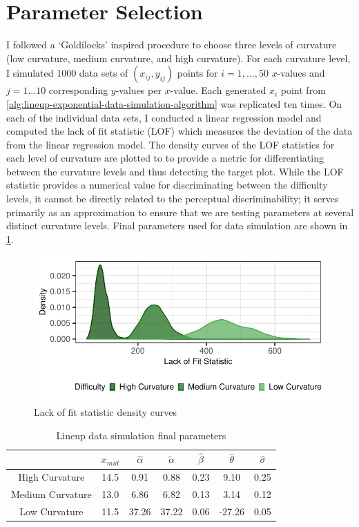 \documentclass[print]{nuthesis}
\begin{document}
\hypertarget{lineups-parameter-selection}{%
\section{Parameter Selection}\label{lineups-parameter-selection}}

I followed a `Goldilocks' inspired procedure to choose three levels of curvature (low curvature, medium curvature, and high curvature). For each curvature level, I simulated 1000 data sets of \((x_{ij}, y_{ij})\) points for \(i = 1,...,50\) \(x\)-values and \(j = 1...10\) corresponding \(y\)-values per \(x\)-value.
Each generated \(x_i\) point from \cref{alg:lineup-exponential-data-simulation-algorithm} was replicated ten times.
On each of the individual data sets, I conducted a linear regression model and computed the lack of fit statistic (LOF) which measures the deviation of the data from the linear regression model.
The density curves of the LOF statistics for each level of curvature are plotted  to to provide a metric for differentiating between the curvature levels and thus detecting the target plot.
While the LOF statistic provides a numerical value for discriminating between the difficulty levels, it cannot be directly related to the perceptual discriminability; it serves primarily as an approximation to ensure that we are testing parameters at several distinct curvature levels.
Final parameters used for data simulation are shown in \cref{tab:parameter-data}.

\begin{figure}[tbp]

{\centering \includegraphics[width=0.75\linewidth,]{thesis_files/figure-latex/lof-density-curves-1} 

}

\caption{Lack of fit statistic density curves}\label{fig:lof-density-curves}
\end{figure}

\begin{table}

\caption{\label{tab:parameter-data}Lineup data simulation final parameters}
\centering
\begin{tabular}[t]{ccccccc}
\toprule
 & $x_{mid}$ & $\hat\alpha$ & $\tilde\alpha$ & $\hat\beta$ & $\hat\theta$ & $\hat\sigma$\\
\midrule
High Curvature & 14.5 & 0.91 & 0.88 & 0.23 & 9.10 & 0.25\\
Medium Curvature & 13.0 & 6.86 & 6.82 & 0.13 & 3.14 & 0.12\\
Low Curvature & 11.5 & 37.26 & 37.22 & 0.06 & -27.26 & 0.05\\
\bottomrule
\end{tabular}
\end{table}
\end{document}
